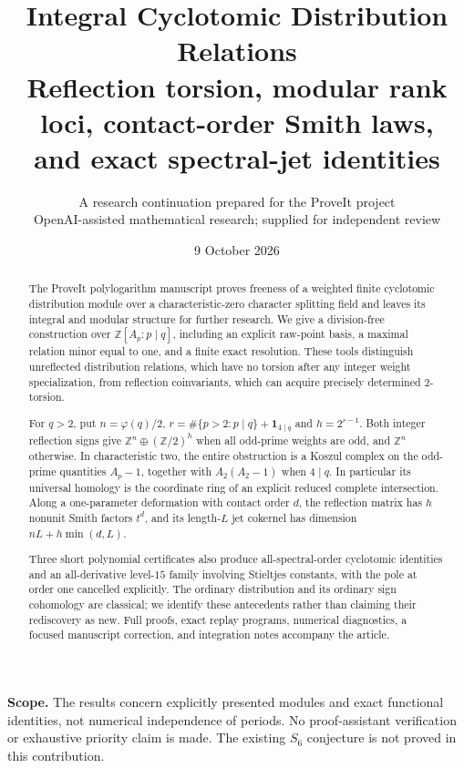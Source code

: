 \documentclass[11pt]{article}
\title{\textbf{Integral Cyclotomic Distribution Relations}\\[7pt]
\large Reflection torsion, modular rank loci, contact-order Smith laws,\\
and exact spectral-jet identities}
\author{A research continuation prepared for the ProveIt project\\
\small OpenAI-assisted mathematical research; supplied for independent review}
\date{9 October 2026}
\numberwithin{equation}{section}
\theoremstyle{definition}
\theoremstyle{remark}
\newcommand{\Z}{\mathbb Z}
\newcommand{\one}{\mathbf 1}
\begin{document}
\maketitle
\begin{abstract}
The ProveIt polylogarithm manuscript proves freeness of a weighted finite
cyclotomic distribution module over a characteristic-zero character
splitting field and leaves its integral and modular structure for further
research. We give a division-free construction over
$\Z[A_p:p\mid q]$, including an explicit raw-point basis, a maximal relation
minor equal to one, and a finite exact resolution. These tools distinguish
unreflected distribution relations, which have no torsion after any integer
weight specialization, from reflection coinvariants, which can acquire
precisely determined $2$-torsion.

For $q>2$, put $n=\varphi(q)/2$,
$r=\#\{p>2:p\mid q\}+\one_{4\mid q}$ and $h=2^{r-1}$.
Both integer reflection signs give $\Z^n\oplus(\Z/2)^h$ when all odd-prime
weights are odd, and $\Z^n$ otherwise. In characteristic two, the entire
obstruction is a Koszul complex on the odd-prime quantities $A_p-1$,
together with $A_2(A_2-1)$ when $4\mid q$. In particular its universal
homology is the coordinate ring of an explicit reduced complete
intersection. Along a one-parameter deformation with contact order $d$,
the reflection matrix has $h$ nonunit Smith factors $t^d$, and its
length-$L$ jet cokernel has dimension $nL+h\min(d,L)$.

Three short polynomial certificates also produce all-spectral-order
cyclotomic identities and an all-derivative level-$15$ family involving
Stieltjes constants, with the pole at order one cancelled explicitly.
The ordinary distribution and its ordinary sign cohomology are classical;
we identify these antecedents rather than claiming their rediscovery as
new. Full proofs, exact replay programs, numerical diagnostics, a focused
manuscript correction, and integration notes accompany the article.
\end{abstract}
\noindent\textbf{Scope.} The results concern explicitly presented modules
and exact functional identities, not numerical independence of periods.
No proof-assistant verification or exhaustive priority claim is made.
The existing $S_6$ conjecture is not proved in this contribution.
\newpage
\begingroup
\fontsize{10}{10.7}\selectfont
\makeatletter
\patchcmd{\l@section}{1.0em}{0.3em}{}{}
\makeatother
\tableofcontents
\endgroup
\newpage








\clearpage

\end{document}

